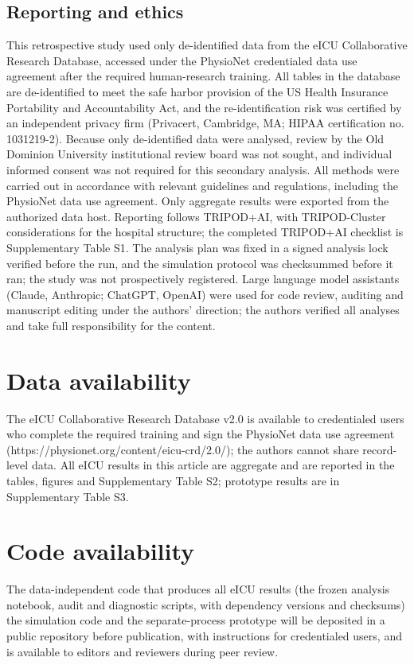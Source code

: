 \documentclass[11pt]{article}
\begin{document}
\subsection*{Reporting and ethics}
This retrospective study used only de-identified data from the eICU Collaborative Research Database, accessed under the PhysioNet credentialed data use agreement after the required human-research training\cite{r1}. All tables in the database are de-identified to meet the safe harbor provision of the US Health Insurance Portability and Accountability Act, and the re-identification risk was certified by an independent privacy firm (Privacert, Cambridge, MA; HIPAA certification no. 1031219-2)\cite{r2}. Because only de-identified data were analysed, review by the Old Dominion University institutional review board was not sought, and individual informed consent was not required for this secondary analysis. All methods were carried out in accordance with relevant guidelines and regulations, including the PhysioNet data use agreement. Only aggregate results were exported from the authorized data host. Reporting follows TRIPOD+AI, with TRIPOD-Cluster considerations for the hospital structure\cite{r9,r19}; the completed TRIPOD+AI checklist is Supplementary Table S1. The analysis plan was fixed in a signed analysis lock verified before the run, and the simulation protocol was checksummed before it ran; the study was not prospectively registered. Large language model assistants (Claude, Anthropic; ChatGPT, OpenAI) were used for code review, auditing and manuscript editing under the authors' direction; the authors verified all analyses and take full responsibility for the content.

\section*{Data availability}
The eICU Collaborative Research Database v2.0 is available to credentialed users who complete the required training and sign the PhysioNet data use agreement (https://physionet.org/content/eicu-crd/2.0/); the authors cannot share record-level data. All eICU results in this article are aggregate and are reported in the tables, figures and Supplementary Table S2; prototype results are in Supplementary Table S3.

\section*{Code availability}
The data-independent code that produces all eICU results (the frozen analysis notebook, audit and diagnostic scripts, with dependency versions and checksums) the simulation code and the separate-process prototype will be deposited in a public repository before publication, with instructions for credentialed users, and is available to editors and reviewers during peer review.
\end{document}
